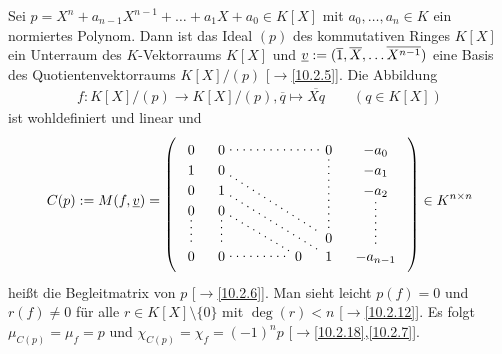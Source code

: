 \documentclass[../../main.tex]{subfiles}
\begin{document}
\begin{er}\label{17.5.1}
    Sei $p=X^n+a_{n-1}X^{n-1}+\ldots +a_1X+a_0\in K[X]$ mit $a_0,\ldots ,a_n\in K$ ein normiertes Polynom. Dann ist das Ideal $(p)$ des kommutativen Ringes $K[X]$ ein Unterraum des $K$-Vektorraums $K[X]$ und ${\underline v}:=(\overline{1},\overline{X},\ldots \overline{X^{n-1}})$ eine Basis des Quotientenvektorraums $K[X]/(p)$ [$\to$\ref{10.2.5}]. Die Abbildung
    \begin{align*}
        f: K[X]/(p)\to K[X]/(p), \overline{q}\mapsto \overline{Xq}\qquad(q\in K[X])
    \end{align*}
    ist wohldefiniert und linear und
    \begin{equation*}
        C(p):=M(f,\v)=
        \begin{tikzpicture}[loosely dotted,thick,baseline]
            \matrix (m) [matrix of math nodes,nodes in empty cells,right delimiter=),left delimiter=(,column sep=1em]{
                0&0&&&&0&-a_0\\
                1&0&&&&  &-a_1\\
                0&1&&&&  &-a_2\\
                0&0\\
                \\
                 &   &&&&0\\
                0&0&&&0&1&-a_{n-1}\\
            } ;
            \draw (m-1-2)-- (m-1-6);
            \draw (m-2-2)-- (m-6-6);
            \draw (m-3-2)-- (m-7-6);
            \draw (m-4-2)-- (m-7-5);
            \draw (m-1-6)-- (m-6-6);
            \draw (m-3-7)-- (m-7-7);
            \draw (m-4-1)-- (m-7-1);
            \draw (m-4-2)-- (m-7-2) -- (m-7-5);
        \end{tikzpicture}\in K^{n\times n}
    \end{equation*}
    heißt die Begleitmatrix von $p$ [$\to$\ref{10.2.6}]. Man sieht leicht $p(f)=0$ und $r(f)\neq 0$ für alle $r\in K[X]\setminus\{0\}$ mit $\deg(r)<n$ [$\to$\ref{10.2.12}]. Es folgt $\mu_{C(p)}=\mu_f=p$ und $\chi_{C(p)}=\chi_f=(-1)^np$ [$\to$\ref{10.2.18},\ref{10.2.7}].
\end{er}
\end{document}
